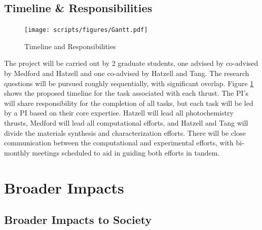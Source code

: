 \vspace{2mm}
\subsection{Timeline \& Responsibilities}
\vspace{2mm}

\begin{figure}
\vspace{-30pt}
\centering
\texttt{[image: scripts/figures/Gantt.pdf]}
\caption{\label{fig:Gantt} Timeline and Responsibilities}
\end{figure}

The project will  be carried out by 2 graduate students, one  advised by co-advised by Medford and Hatzell and one co-advised by Hatzell and Tang. The research questions will be pursued roughly sequentially, with significant overlap. Figure \ref{fig:Gantt} shows the proposed timeline for the task associated with each thrust. The PI's will share responsibility for the completion of all tasks, but each task will be led by a PI based on their core expertise. Hatzell will lead all photochemistry thrusts, Medford will lead all computational efforts, and Hatzell and Tang will divide the materials synthesis and characterization efforts. There will be close communication between the computational and experimental efforts, with bi-monthly meetings scheduled to aid in guiding both efforts in tandem. 
\vspace{2mm}

\section{Broader Impacts}
\label{sec:BI}
\vspace{2mm}

\subsection{Broader Impacts to Society}
\vspace{2mm}

